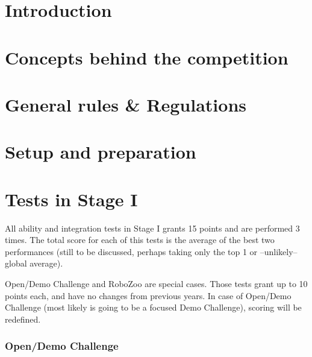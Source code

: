 \documentclass[11pt, twoside, openright, a4paper, chapterprefix]{scrbook}
\begin{document}


\pagestyle{empty}

\clearpage

\pagestyle{empty}
\tableofcontents
\clearpage

\pagestyle{plain}

\chapter{Introduction}
\chapter{Concepts behind the competition}
\chapter{General rules \& Regulations}
\chapter{Setup and preparation}

\chapter{Tests in Stage I}

\begin{itshape}
All ability and integration tests in Stage I grants 15 points and are performed 3 times. The total score for each of this tests is the average of the best two performances (still to be discussed, perhaps taking only the top 1 or --unlikely-- global average).

Open/Demo Challenge and RoboZoo are special cases. Those tests grant up to 10 points each, and have no changes from previous years. In case of Open/Demo Challenge (most likely is going to be a focused Demo Challenge), scoring will be redefined.
\end{itshape}







\subsection{Open/Demo Challenge}


\end{document}

